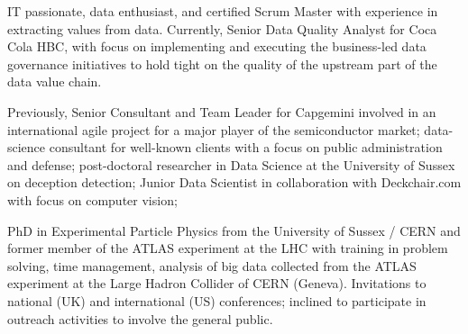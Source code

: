 

IT passionate, data enthusiast, and certified Scrum Master with experience in extracting values from data. 
Currently, Senior Data Quality Analyst for Coca Cola HBC, with focus on implementing and executing the business-led 
data governance initiatives to hold tight on the quality of the upstream part of the data value chain. 

Previously, Senior Consultant and Team Leader for Capgemini involved in an international agile project 
for a major player of the semiconductor market; data-science consultant for well-known clients with a focus on public 
administration and defense; post-doctoral researcher in Data Science at the University of Sussex on deception detection;
Junior Data Scientist in collaboration with Deckchair.com with focus on computer vision;

PhD in Experimental Particle Physics from the University of Sussex / CERN and former member of the ATLAS experiment at the LHC with training in
problem solving, time management, analysis of big data collected from the ATLAS experiment at the Large Hadron Collider of CERN (Geneva).
Invitations to national (UK) and international (US) conferences; inclined to participate in outreach activities to involve the general public.
